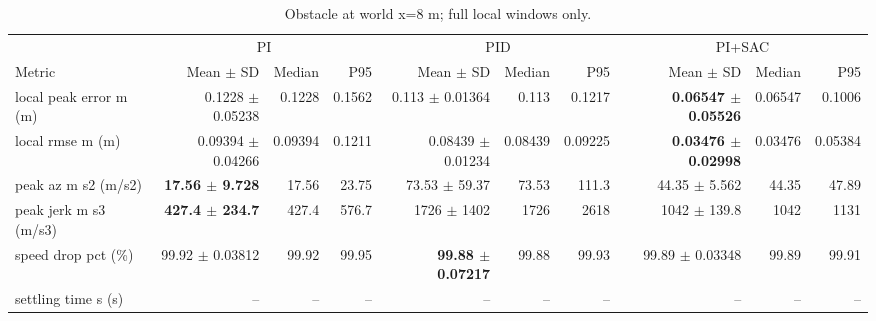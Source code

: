 \begin{table}[t]
\centering
\scriptsize
\caption{Obstacle at world x=8 m; full local windows only.}
\label{tab:obstacle-12}
\begin{tabular}{p{}*{9}{r}}
\toprule
 & \multicolumn{3}{c}{PI} & \multicolumn{3}{c}{PID} & \multicolumn{3}{c}{PI+SAC} \\
\cmidrule(lr){2-4}\cmidrule(lr){5-7}\cmidrule(lr){8-10}
Metric & Mean $\pm$ SD & Median & P95 & Mean $\pm$ SD & Median & P95 & Mean $\pm$ SD & Median & P95 \\
\midrule
local peak error m (m) & 0.1228 $\pm$ 0.05238 & 0.1228 & 0.1562 & 0.113 $\pm$ 0.01364 & 0.113 & 0.1217 & \textbf{0.06547 $\pm$ 0.05526} & 0.06547 & 0.1006 \\
local rmse m (m) & 0.09394 $\pm$ 0.04266 & 0.09394 & 0.1211 & 0.08439 $\pm$ 0.01234 & 0.08439 & 0.09225 & \textbf{0.03476 $\pm$ 0.02998} & 0.03476 & 0.05384 \\
peak az m s2 (m/s2) & \textbf{17.56 $\pm$ 9.728} & 17.56 & 23.75 & 73.53 $\pm$ 59.37 & 73.53 & 111.3 & 44.35 $\pm$ 5.562 & 44.35 & 47.89 \\
peak jerk m s3 (m/s3) & \textbf{427.4 $\pm$ 234.7} & 427.4 & 576.7 & 1726 $\pm$ 1402 & 1726 & 2618 & 1042 $\pm$ 139.8 & 1042 & 1131 \\
speed drop pct (\%) & 99.92 $\pm$ 0.03812 & 99.92 & 99.95 & \textbf{99.88 $\pm$ 0.07217} & 99.88 & 99.93 & 99.89 $\pm$ 0.03348 & 99.89 & 99.91 \\
settling time s (s) & -- & -- & -- & -- & -- & -- & -- & -- & -- \\
\bottomrule
\end{tabular}
\end{table}
